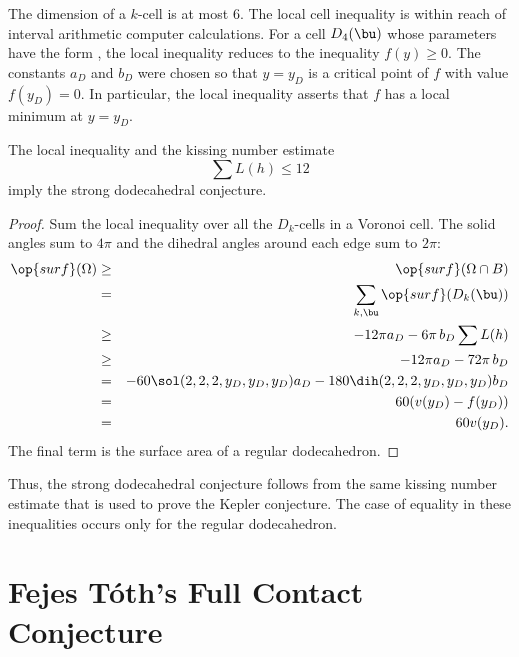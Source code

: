 \begin{remark}
  The dimension of a $k$-cell is at most $6$.  The local cell
  inequality is within reach of interval arithmetic computer
  calculations.  For a cell $D_4(\bu)$ whose parameters have the form
  , the local inequality reduces to the inequality
  $f(y)\ge 0$.  The constants $a_D$ and $b_D$ were chosen so that
  $y=y_D$ is a critical point of $f$ with value $f(y_D)=0$.  In
  particular, the local inequality asserts that $f$ has a local
  minimum at $y=y_D$.
\end{remark}

\begin{lemma}[]
  The local inequality and the kissing number estimate 
\begin{displaymath}
\sum L(h) \le 12
\end{displaymath}
imply the strong dodecahedral conjecture.
\end{lemma}

\begin{proof} 
  Sum the local inequality over all the $D_k$-cells in a Voronoi cell.
  The solid angles sum to $4\pi$ and the dihedral angles around each
  edge sum to $2\pi$:
\begin{eqnarray*}
  \op{surf}(\Omega) &\ge& \op{surf}(\Omega\cap B)\\
  &=&\sum_{k,\bu} \op{surf}(D_k(\bu))\\
  &\ge& -12\pi a_D - 6\pi\, b_D  \sum L(h)\\
  &\ge& -12\pi a_D - 72\pi\, b_D\\
  &=& -60 \sol(2,2,2,y_D,y_D,y_D) a_D - 180 \dih(2,2,2,y_D,y_D,y_D) b_D\\
  &=& 60 (v(y_D) - f(y_D))\\
  &=& 60 v(y_D).\\
\end{eqnarray*}
The final term is the surface area of a regular dodecahedron.
\end{proof}

Thus, the strong dodecahedral conjecture follows from the same kissing
number estimate that is used to prove the Kepler conjecture.  The case
of equality in these inequalities occurs only for the regular
dodecahedron.

\newpage
\section{Fejes T\'oth's Full Contact Conjecture}



